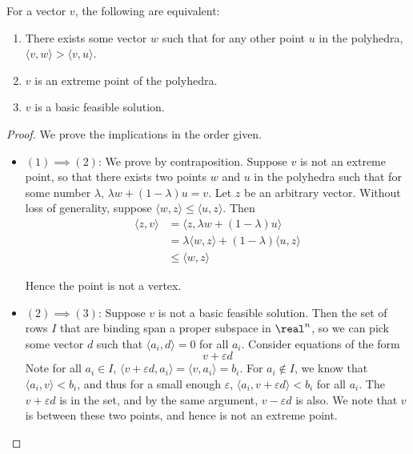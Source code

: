     \begin{theorem}
        For a vector $v$, the following are equivalent:

        \begin{enumerate}
            \item There exists some vector $w$ such that for any other point $u$ in the polyhedra,
            $\langle v, w \rangle > \langle v, u \rangle$.
            \item $v$ is an extreme point of the polyhedra.
            \item $v$ is a basic feasible solution.
        \end{enumerate}
    \end{theorem}
    \begin{proof}
        We prove the implications in the order given.

        \begin{itemize}
            \item $(1) \implies (2)$: We prove by contraposition. Suppose $v$ is not an extreme point, so that there exists two points $w$ and $u$ in the polyhedra such that for some number $\lambda$, $\lambda w + (1 - \lambda)u = v$. Let $z$ be an arbitrary vector. Without loss of generality, suppose $\langle w, z \rangle \leq \langle u, z \rangle$. Then
            \begin{align*}
                \langle z, v \rangle &= \langle z, \lambda w + (1 - \lambda) u \rangle\\
                                     &= \lambda \langle w, z \rangle + (1 - \lambda) \langle u, z \rangle\\
                                     &\leq \langle w , z \rangle
            \end{align*}

            Hence the point is not a vertex.

            \item $(2) \implies (3)$: Suppose $v$ is not a basic feasible solution. Then the set of rows $I$ that are binding span a proper subspace in $\real^n$, so we can pick some vector $d$ such that $\langle a_i, d \rangle = 0$ for all $a_i$. Consider equations of the form
            \[ v + \varepsilon d \]
            Note for all $a_i \in I$, $\langle v + \varepsilon d, a_i \rangle = \langle v, a_i \rangle = b_i$. For $a_i \notin I$, we know that $\langle a_i, v \rangle < b_i$, and thus for a small enough $\varepsilon$, $\langle a_i, v + \varepsilon d \rangle < b_i$ for all $a_i$. The $v + \varepsilon d$ is in the set, and by the same argument, $v - \varepsilon d$ is also. We note that $v$ is between these two points, and hence is not an extreme point.


\end{itemize}
\end{proof}
